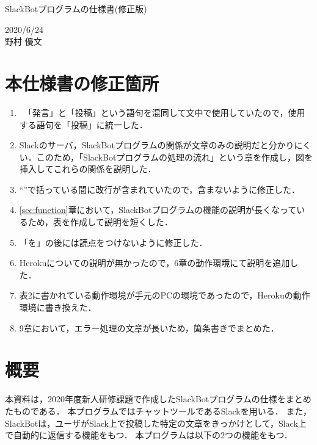 \documentclass[12pt]{jsarticle}
\begin{document}
\begin{center}
{\LARGE SlackBotプログラムの仕様書(修正版)}
\end{center}

\begin{flushright}
  2020/6/24\\
  野村 優文
\end{flushright}
\section{本仕様書の修正箇所}
\begin{enumerate}
\item　「発言」と「投稿」という語句を混同して文中で使用していたので，使用する語句を「投稿」に統一した．

\item Slackのサーバ，SlackBotプログラムの関係が文章のみの説明だと分かりにくい．このため，「SlackBotプログラムの処理の流れ」という章を作成し，図を挿入してこれらの関係を説明した．

\item ``''で括っている間に改行が含まれていたので，含まないように修正した．

\item \ref{sec:function}章において，SlackBotプログラムの機能の説明が長くなっているため，表を作成して説明を短くした．

\item 「を」の後には読点をつけないように修正した．

\item Herokuについての説明が無かったので，6章の動作環境にて説明を追加した．
  
\item 表2に書かれている動作環境が手元のPCの環境であったので，Herokuの動作環境に書き換えた．
  
\item 9章において，エラー処理の文章が長いため，箇条書きでまとめた．
    
\end{enumerate}

\section{概要}\label{sec:overview}
\label{sec:introduction}
本資料は，2020年度新人研修課題で作成したSlackBotプログラムの仕様をまとめたものである．
本プログラムではチャットツールであるSlack\cite{Slack}を用いる．
また，SlackBotは，ユーザがSlack上で投稿した特定の文章をきっかけとして，Slack上で自動的に返信する機能をもつ．
本プログラムは以下の2つの機能をもつ．
\end{document}
